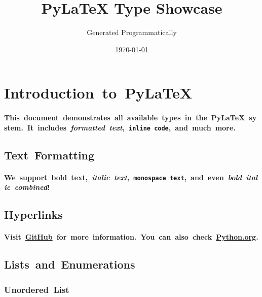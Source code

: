 \documentclass{article}
\title{PyLaTeX Type Showcase}
\author{Generated Programmatically}
\date{\today}
\begin{document}
\maketitle

\tableofcontents
\newpage

{\relax\relax \section{Introduction~to~PyLaTeX}\relax \relax\relax \paragraph{{\relax\relax This~document~demonstrates~\relax\relax \textbf{all~available~types}\relax \relax\relax ~in~the~PyLaTeX~system.~It~includes~\relax\relax \textit{formatted~text}\relax \relax\relax ,~\relax\relax \texttt{inline~code}\relax \relax\relax ,~and~much~more.}}\relax \relax\relax \subsection{Text~Formatting}\relax \relax\relax \paragraph{{\relax\relax We~support~\relax\relax \textbf{bold~text}\relax \relax\relax ,~\relax\relax \textit{italic~text}\relax \relax\relax ,~\relax\relax \texttt{monospace~text}\relax \relax\relax ,~and~even~\relax\relax \textbf{\textit{bold~italic~combined}\relax }\relax \relax\relax !}}\relax \relax\relax \subsection{Hyperlinks}\relax \relax\relax \paragraph{{\relax\relax Visit~\relax\relax \href{https://github.com}{\textbf{GitHub}\relax }\relax \relax\relax ~for~more~information.~You~can~also~check~\relax\relax \href{https://www.python.org}{Python.org}\relax \relax\relax .}}\relax \relax\relax \subsection{Lists~and~Enumerations}\relax \relax\relax \subsubsection{Unordered~List}\relax \relax\relax \begin{itemize}

\end{itemize}}
\end{document}
